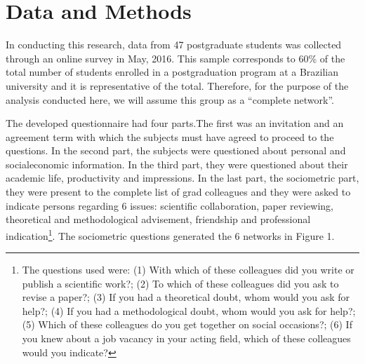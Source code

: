 \documentclass[12pt, english]{article}
\begin{document}
\section{Data and Methods}

In conducting this research, data from 47 postgraduate students was collected through an online survey in May, 2016. This sample corresponds to 60\% of the total number of students enrolled in a postgraduation program at a Brazilian university and it is representative of the total. Therefore, for the purpose of the analysis conducted here, we will assume this group as a ``complete network''.

The developed questionnaire had four parts.The first was an invitation and an agreement term with which the subjects must have agreed to proceed to the questions. In the second part, the subjects were questioned about personal and socialeconomic information. In the third part, they were questioned about their academic life, productivity and impressions. In the last part, the sociometric part, they were present to the complete list of grad colleagues and they were asked to indicate persons regarding 6 issues: scientific collaboration, paper reviewing, theoretical and methodological advisement, friendship and professional indication\footnote{The questions used were: (1) With which of these colleagues did you write or publish a scientific work?; (2) To which of these colleagues did you ask to revise a paper?; (3) If you had a theoretical doubt, whom would you ask for help?; (4) If you had a methodological doubt, whom would you ask for help?; (5) Which of these colleagues do you get together on social occasions?; (6) If you knew about a job vacancy in your acting field, which of these colleagues would you indicate?}. The sociometric questions generated the 6 networks in Figure 1.

\end{document}
